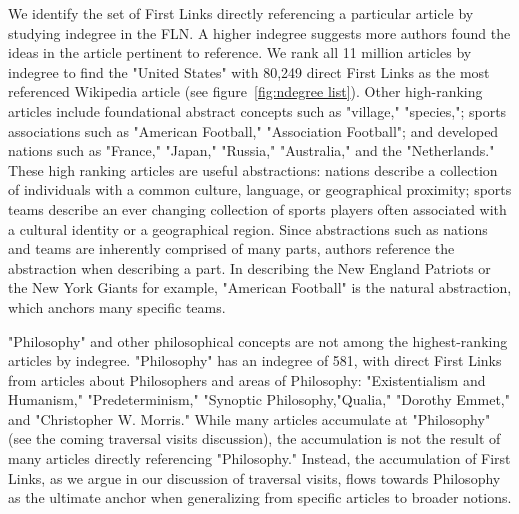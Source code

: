 \documentclass[pre,twocolumn,twoside,superscriptaddress,floatfix, aps, 10pt]{revtex4-1}
\begin{document}
We identify the set of First Links directly referencing a particular article 
by studying indegree in the FLN.
A higher indegree suggests more authors found the ideas in the article 
pertinent to reference. 
We rank all 11 million articles by indegree to find 
the "United States" with 80,249 direct First Links as the most referenced
Wikipedia article 
(see figure~\ref{fig:ndegree list}). 
Other high-ranking articles
include foundational abstract concepts such as "village," "species,"; 
sports associations such as "American Football," "Association Football"; 
and developed nations such as "France," "Japan," "Russia," "Australia," and 
the "Netherlands." These high ranking articles are useful abstractions: nations
describe a collection of individuals with a common culture, language, or 
geographical proximity; sports teams describe an ever changing collection of 
sports players often associated with a cultural identity or a geographical 
region. 
Since abstractions such as nations and teams are inherently comprised
of many parts, authors reference the abstraction when describing a part.
In describing the New England Patriots or the New York Giants
for example, "American Football" is the natural abstraction, which 
anchors many specific teams.

"Philosophy" and other philosophical concepts
are not among the highest-ranking articles by indegree.
"Philosophy" has an indegree of 581, with direct First Links from articles about Philosophers and areas of Philosophy: "Existentialism and Humanism," "Predeterminism," "Synoptic Philosophy,"Qualia," "Dorothy Emmet," and "Christopher W. Morris."
While many articles accumulate at "Philosophy" (see the coming traversal visits discussion), 
the accumulation is not the 
result of many articles directly referencing "Philosophy." 
Instead, the accumulation of First Links, as we argue in our 
discussion of traversal visits, flows towards Philosophy as the 
ultimate anchor when generalizing from specific articles to broader notions.
\end{document}
